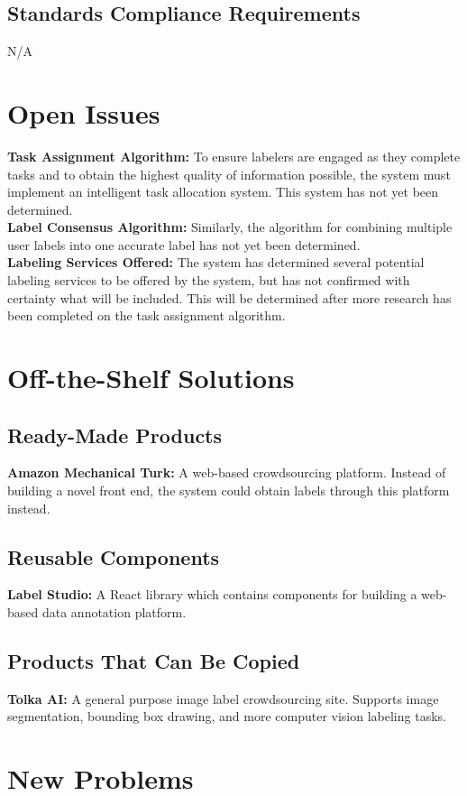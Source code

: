 \documentclass[12pt]{article}
\begin{document}
\subsection{Standards Compliance Requirements}
N/A

\section{Open Issues}
\textbf{Task Assignment Algorithm: }To ensure labelers are engaged as they complete tasks and to obtain the highest quality of information possible, the system must implement an intelligent task allocation system. This system has not yet been determined.
\\\textbf{Label Consensus Algorithm: }Similarly, the algorithm for combining multiple user labels into one accurate label has not yet been determined. 
\\\textbf{Labeling Services Offered: }The system has determined several potential labeling services to be offered by the system, but has not confirmed with certainty what will be included. This will be determined after more research has been completed on the task assignment algorithm.

\section{Off-the-Shelf Solutions}
\subsection{Ready-Made Products}
\textbf{Amazon Mechanical Turk: } A web-based crowdsourcing platform. Instead of building a novel front end, the system could obtain labels through this platform instead.
\subsection{Reusable Components}
\textbf{Label Studio: } A React library which contains components for building a web-based data annotation platform.
\subsection{Products That Can Be Copied}
\textbf{Tolka AI: } A general purpose image label crowdsourcing site. Supports image segmentation, bounding box drawing, and more computer vision labeling tasks.



\section{New Problems}
\end{document}

